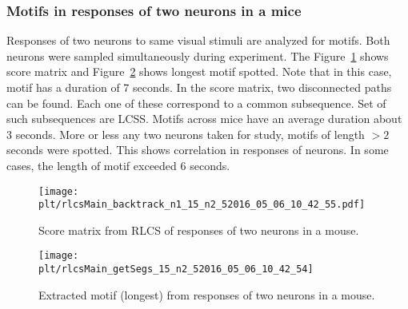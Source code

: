 \documentclass[MTech]{iitmdiss}
\newcommand{\plt}{thesis_plots}
\begin{document}
\subsubsection{Motifs in responses of two neurons in a mice} %
\label{ssub:motifs_in_responses_of_two_neurons_in_a_mice}
Responses of two neurons to same visual stimuli are analyzed for motifs. Both neurons were sampled simultaneously during experiment. The Figure~\ref{img:score_neuron} shows score matrix and Figure~\ref{img:motif_neuron} shows longest motif spotted. Note that in this case, motif has a duration of 7 seconds. In the score matrix, two disconnected paths can be found. Each one of these correspond to a common subsequence. Set of such subsequences are LCSS. Motifs across mice have an average duration about $3$ seconds. More or less any two neurons taken for study, motifs of length $> 2$ seconds were spotted. This shows correlation in responses of neurons. In some cases, the length of motif exceeded $6$ seconds.
\begin{figure}
    \centering
    \texttt{[image: \\plt/rlcsMain\_backtrack\_n1\_15\_n2\_52016\_05\_06\_10\_42\_55.pdf]}
    \caption{Score matrix from RLCS of responses of two neurons in a mouse.}
    \label{img:score_neuron}
\end{figure}
\begin{figure}
    \centering
    \texttt{[image: \\plt/rlcsMain\_getSegs\_15\_n2\_52016\_05\_06\_10\_42\_54]}
    \caption{Extracted motif (longest) from responses of two neurons in a mouse.}
    \label{img:motif_neuron}
\end{figure}
\end{document}

